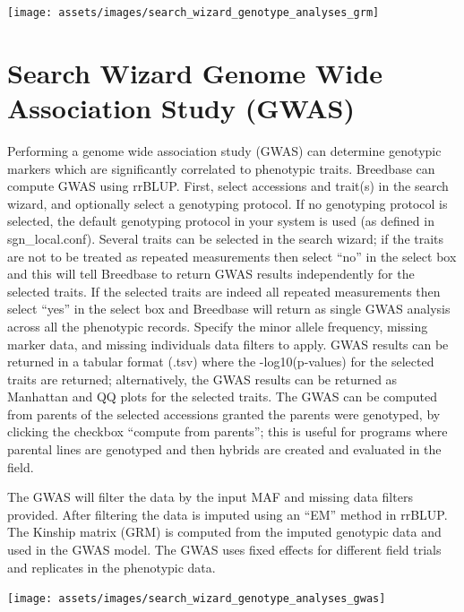 \documentclass[
  12pt,
]{book}
\begin{document}
\begin{center}\texttt{[image: assets/images/search\_wizard\_genotype\_analyses\_grm]} \end{center}

\hypertarget{search-wizard-genome-wide-association-study-gwas}{%
\section{Search Wizard Genome Wide Association Study (GWAS)}\label{search-wizard-genome-wide-association-study-gwas}}

Performing a genome wide association study (GWAS) can determine genotypic markers which are significantly correlated to phenotypic traits. Breedbase can compute GWAS using rrBLUP. First, select accessions and trait(s) in the search wizard, and optionally select a genotyping protocol. If no genotyping protocol is selected, the default genotyping protocol in your system is used (as defined in sgn\_local.conf). Several traits can be selected in the search wizard; if the traits are not to be treated as repeated measurements then select ``no'' in the select box and this will tell Breedbase to return GWAS results independently for the selected traits. If the selected traits are indeed all repeated measurements then select ``yes'' in the select box and Breedbase will return as single GWAS analysis across all the phenotypic records. Specify the minor allele frequency, missing marker data, and missing individuals data filters to apply. GWAS results can be returned in a tabular format (.tsv) where the -log10(p-values) for the selected traits are returned; alternatively, the GWAS results can be returned as Manhattan and QQ plots for the selected traits. The GWAS can be computed from parents of the selected accessions granted the parents were genotyped, by clicking the checkbox ``compute from parents''; this is useful for programs where parental lines are genotyped and then hybrids are created and evaluated in the field.

The GWAS will filter the data by the input MAF and missing data filters provided. After filtering the data is imputed using an ``EM'' method in rrBLUP. The Kinship matrix (GRM) is computed from the imputed genotypic data and used in the GWAS model. The GWAS uses fixed effects for different field trials and replicates in the phenotypic data.

\begin{center}\texttt{[image: assets/images/search\_wizard\_genotype\_analyses\_gwas]} \end{center}
\end{document}
